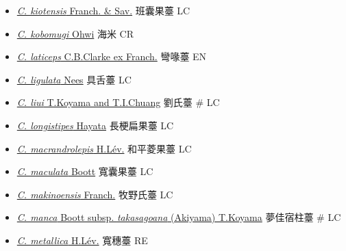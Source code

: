 \begin{itemize}
\begin{itemize}
        \item[] \href{http://www.theplantlist.org/tpl1.1/search?q=Carex+kiotensis}{\textit{C. kiotensis} Franch. \& Sav.}   班囊果薹   LC
        \item[] \href{http://www.theplantlist.org/tpl1.1/search?q=Carex+kobomugi}{\textit{C. kobomugi} Ohwi}   海米   CR
        \item[] \href{http://www.theplantlist.org/tpl1.1/search?q=Carex+laticeps}{\textit{C. laticeps} C.B.Clarke ex Franch.}   彎喙薹   EN
        \item[] \href{http://www.theplantlist.org/tpl1.1/search?q=Carex+ligulata}{\textit{C. ligulata} Nees}   具舌薹   LC
        \item[] \href{http://www.theplantlist.org/tpl1.1/search?q=Carex+liui}{\textit{C. liui} T.Koyama and T.I.Chuang}   劉氏薹  \# LC
        \item[] \href{http://www.theplantlist.org/tpl1.1/search?q=Carex+longistipes}{\textit{C. longistipes} Hayata}   長梗扁果薹   LC
        \item[] \href{http://www.theplantlist.org/tpl1.1/search?q=Carex+macrandrolepis}{\textit{C. macrandrolepis} H.Lév.}   和平菱果薹   LC
        \item[] \href{http://www.theplantlist.org/tpl1.1/search?q=Carex+maculata}{\textit{C. maculata} Boott}   寬囊果薹   LC
        \item[] \href{http://www.theplantlist.org/tpl1.1/search?q=Carex+makinoensis}{\textit{C. makinoensis} Franch.}   牧野氏薹   LC
        \item[] \href{http://www.theplantlist.org/tpl1.1/search?q=Carex+manca+subsp.+takasagoana}{\textit{C. manca} Boott subsp. \textit{takasagoana} (Akiyama) T.Koyama}   夢佳宿柱薹  \# LC
        \item[] \href{http://www.theplantlist.org/tpl1.1/search?q=Carex+metallica}{\textit{C. metallica} H.Lév.}   寬穗薹   RE

\end{itemize}
\end{itemize}
